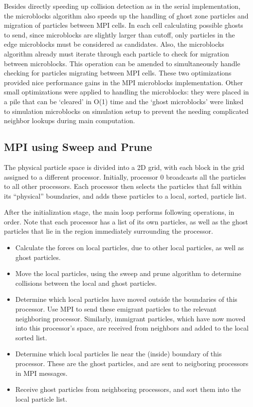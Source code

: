 \documentclass[11pt]{article} %
\begin{document}
Besides directly speeding up collision detection as in the serial implementation, the microblocks algorithm also speeds up the handling of ghost zone particles and migration of particles between MPI cells. In each cell calculating possible ghosts to send, since microblocks are slightly larger than cutoff, only particles in the edge microblocks must be considered as candidates. Also, the microblocks algorithm already must iterate through each particle to check for migration between microblocks. This operation can be amended to simultaneously handle checking for particles migrating between MPI cells. These two optimizations provided nice performance gains in the MPI microblocks implementation. Other small optimizations were applied to handling the microblocks: they were placed in a pile that can be `cleared' in O(1) time and the `ghost microblocks' were linked to simulation microblocks on simulation setup to prevent the needing complicated neighbor lookups during main computation.

\subsection{MPI using Sweep and Prune}

The physical particle space is divided into a 2D grid, with each block in the grid assigned to a different processor. Initially, processor 0 broadcasts all the particles to all other processors. Each processor then selects the particles that fall within its ``physical'' boundaries, and adds these particles to a local, sorted, particle list.

After the initialization stage, the main loop performs following operations, in order. Note that each processor has a list of its own particles, as well as the ghost particles that lie in the region immediately surrounding the processor.
\begin{itemize}
\item Calculate the forces on local particles, due to other local particles, as well as ghost particles.
\item Move the local particles, using the sweep and prune algorithm to determine collisions between the local and ghost particles.
\item Determine which local particles have moved outside the boundaries of this processor. Use MPI to send these emigrant particles to the relevant neighboring processor. Similarly, immigrant particles, which have now moved into this processor's space, are received from neighbors and added to the local sorted list.
\item Determine which local particles lie near the (inside) boundary of this processor. These are the ghost particles, and are sent to neigboring processors in MPI messages.
\item Receive ghost particles from neighboring processors, and sort them into the local particle list.
\end{itemize}
\end{document}
